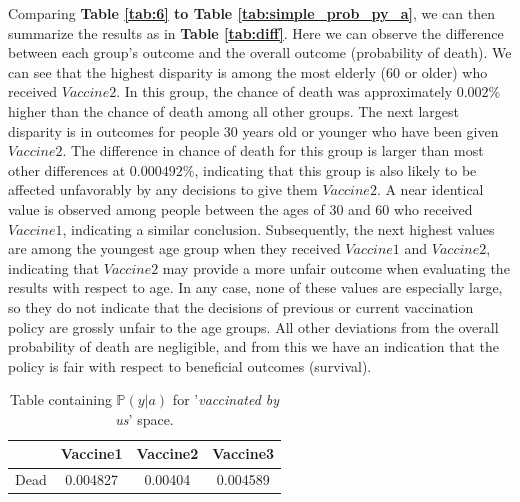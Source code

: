 \documentclass{article}
\begin{document}
Comparing \textbf{Table \ref{tab:6} to Table \ref{tab:simple_prob_py_a}}, we can then summarize the results as in \textbf{Table \ref{tab:diff}}. Here we can observe the difference between each group's outcome and the overall outcome (probability of death). We can see that the highest disparity is among the most elderly ($60$ or older) who received $Vaccine2$. In this group, the chance of death was approximately $0.002\%$ higher than the  chance of death among all other groups. The next largest disparity is in outcomes for people $30$ years old or younger who have been given $Vaccine2$. The difference in chance of death for this group is larger than most other differences at $0.000492\%$, indicating that this group is also likely to be affected unfavorably by any decisions to give them $Vaccine2$. A near identical value is observed among people between the ages of $30$ and $60$ who received $Vaccine1$, indicating a similar conclusion. Subsequently, the next highest values are among the youngest age group when they received $Vaccine1$ and $Vaccine2$, indicating that $Vaccine2$ may provide a more unfair outcome when evaluating the results with respect to age. In any case, none of these values are especially large, so they do not indicate that the decisions of previous or current vaccination policy are grossly unfair to the age groups. All other deviations from the overall probability of death are negligible, and from this we have an indication that the policy is fair with respect to beneficial outcomes (survival).

\begin{center}
\begin{table}[H]
\centering
    \begin{tabular}{ |c| c c c|}
    \hline
      & Vaccine1 &  Vaccine2 & Vaccine3  \\
    \hline
    Dead &  0.004827 &   0.00404 &  0.004589
     \\ \hline
    \end{tabular}
    \caption{Table containing $\mathbb{P}(y | a)$ for '\textit{vaccinated by us}' space.}
\end{table}
\end{center}
\end{document}
